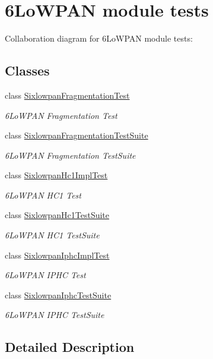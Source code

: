 \hypertarget{group__sixlowpan-test}{}\section{6\+Lo\+W\+P\+AN module tests}
\label{group__sixlowpan-test}
Collaboration diagram for 6\+Lo\+W\+P\+AN module tests\+:
\subsection*{Classes}
\begin{DoxyCompactItemize}
\item 
class \hyperlink{classSixlowpanFragmentationTest}{Sixlowpan\+Fragmentation\+Test}
\begin{DoxyCompactList}\small\item\em 6\+Lo\+W\+P\+AN Fragmentation Test \end{DoxyCompactList}\item 
class \hyperlink{classSixlowpanFragmentationTestSuite}{Sixlowpan\+Fragmentation\+Test\+Suite}
\begin{DoxyCompactList}\small\item\em 6\+Lo\+W\+P\+AN Fragmentation Test\+Suite \end{DoxyCompactList}\item 
class \hyperlink{classSixlowpanHc1ImplTest}{Sixlowpan\+Hc1\+Impl\+Test}
\begin{DoxyCompactList}\small\item\em 6\+Lo\+W\+P\+AN H\+C1 Test \end{DoxyCompactList}\item 
class \hyperlink{classSixlowpanHc1TestSuite}{Sixlowpan\+Hc1\+Test\+Suite}
\begin{DoxyCompactList}\small\item\em 6\+Lo\+W\+P\+AN H\+C1 Test\+Suite \end{DoxyCompactList}\item 
class \hyperlink{classSixlowpanIphcImplTest}{Sixlowpan\+Iphc\+Impl\+Test}
\begin{DoxyCompactList}\small\item\em 6\+Lo\+W\+P\+AN I\+P\+HC Test \end{DoxyCompactList}\item 
class \hyperlink{classSixlowpanIphcTestSuite}{Sixlowpan\+Iphc\+Test\+Suite}
\begin{DoxyCompactList}\small\item\em 6\+Lo\+W\+P\+AN I\+P\+HC Test\+Suite \end{DoxyCompactList}\end{DoxyCompactItemize}


\subsection{Detailed Description}
